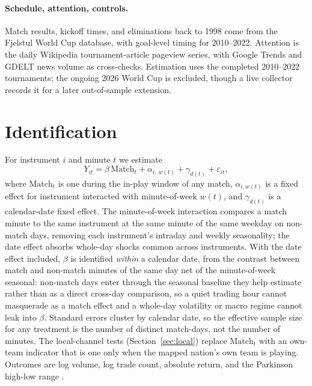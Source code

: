\documentclass[12pt]{article}
\begin{document}
\paragraph{Schedule, attention, controls.} Match results, kickoff times, and eliminations back to 1998 come from the Fjelstul World Cup database, with goal-level timing for 2010--2022. Attention is the daily Wikipedia tournament-article pageview series, with Google Trends and GDELT news volume as cross-checks. Estimation uses the completed 2010--2022 tournaments; the ongoing 2026 World Cup is excluded, though a live collector records it for a later out-of-sample extension.

\section{Identification}\label{sec:ident}
For instrument $i$ and minute $t$ we estimate
\begin{equation}\label{eq:main}
Y_{it} = \beta\, \mathrm{Match}_t + \alpha_{i,\,w(t)} + \gamma_{d(t)} + \varepsilon_{it},
\end{equation}
where $\mathrm{Match}_t$ is one during the in-play window of any match, $\alpha_{i,w(t)}$ is a fixed effect for instrument interacted with minute-of-week $w(t)$, and $\gamma_{d(t)}$ is a calendar-date fixed effect. The minute-of-week interaction compares a match minute to the same instrument at the same minute of the same weekday on non-match days, removing each instrument's intraday and weekly seasonality; the date effect absorbs whole-day shocks common across instruments. With the date effect included, $\beta$ is identified \emph{within} a calendar date, from the contrast between match and non-match minutes of the same day net of the minute-of-week seasonal: non-match days enter through the seasonal baseline they help estimate rather than as a direct cross-day comparison, so a quiet trading hour cannot masquerade as a match effect and a whole-day volatility or macro regime cannot leak into $\beta$. Standard errors cluster by calendar date, so the effective sample size for any treatment is the number of distinct match-days, not the number of minutes. The local-channel tests (Section~\ref{sec:local}) replace $\mathrm{Match}_t$ with an own-team indicator that is one only when the mapped nation's own team is playing. Outcomes are log volume, log trade count, absolute return, and the Parkinson high-low range \cite{parkinson1980}.
\end{document}
